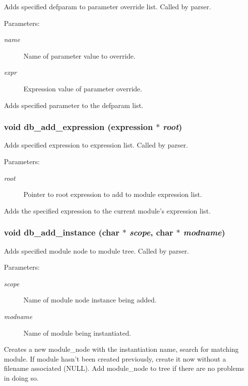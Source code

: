 Adds specified defparam to parameter override list. Called by parser.

\begin{Desc}
\item[Parameters:]
\begin{description}
\item[{\em name}]Name of parameter value to override. \item[{\em expr}]Expression value of parameter override.\end{description}
\end{Desc}
Adds specified parameter to the defparam list. 
\subsubsection{\setlength{\rightskip}{0pt plus 5cm}void db\_\-add\_\-expression ({\bf expression} $\ast$ {\em root})}\label{db_8h_a12}


Adds specified expression to expression list. Called by parser.

\begin{Desc}
\item[Parameters:]
\begin{description}
\item[{\em root}]Pointer to root expression to add to module expression list.\end{description}
\end{Desc}
Adds the specified expression to the current module's expression list. 
\subsubsection{\setlength{\rightskip}{0pt plus 5cm}void db\_\-add\_\-instance (char $\ast$ {\em scope}, char $\ast$ {\em modname})}\label{db_8h_a2}


Adds specified module node to module tree. Called by parser.

\begin{Desc}
\item[Parameters:]
\begin{description}
\item[{\em scope}]Name of module node instance being added. \item[{\em modname}]Name of module being instantiated.\end{description}
\end{Desc}
Creates a new module\_\-node with the instantiation name, search for matching module. If module hasn't been created previously, create it now without a filename associated (NULL). Add module\_\-node to tree if there are no problems in doing so. 
